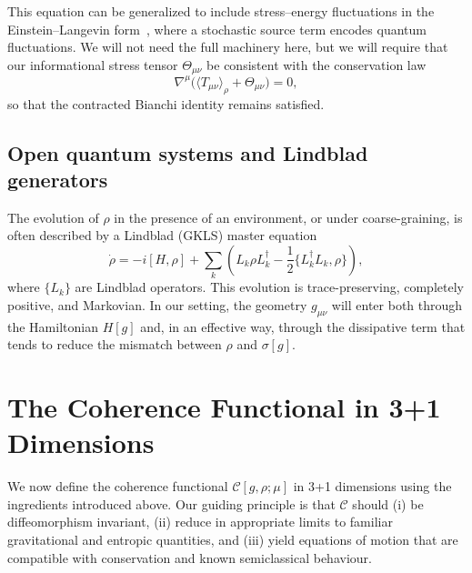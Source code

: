 \documentclass[aps,prd,twocolumn,superscriptaddress,nofootinbib,floatfix]{revtex4-2}
\newcommand{\Cfunc}{\mathcal{C}}
\newcommand{\Tmn}{\Theta_{\mu\nu}}
\begin{document}
This equation can be generalized to include stress--energy fluctuations in the Einstein--Langevin form~\cite{HuVerdaguer2008}, where a stochastic source term encodes quantum fluctuations.
We will not need the full machinery here, but we will require that our informational stress tensor $\Tmn$ be consistent with the conservation law
\begin{equation}
    \nabla^\mu\big(
        \langle T_{\mu\nu}\rangle_\rho + \Tmn
    \big) = 0,
    \label{eq:conservation}
\end{equation}
so that the contracted Bianchi identity remains satisfied.

\subsection{Open quantum systems and Lindblad generators}

The evolution of $\rho$ in the presence of an environment, or under coarse-graining, is often described by a Lindblad (GKLS) master equation~\cite{Lindblad1976}
\begin{equation}
    \dot{\rho}
    =
    -i[H,\rho]
    +
    \sum_k
    \left(
        L_k \rho L_k^\dagger
        - \frac{1}{2}\{L_k^\dagger L_k,\rho\}
    \right),
    \label{eq:lindblad}
\end{equation}
where $\{L_k\}$ are Lindblad operators.
This evolution is trace-preserving, completely positive, and Markovian.
In our setting, the geometry $g_{\mu\nu}$ will enter both through the Hamiltonian $H[g]$ and, in an effective way, through the dissipative term that tends to reduce the mismatch between $\rho$ and $\sigma[g]$.




\section{The Coherence Functional in 3+1 Dimensions}
\label{sec:coherence-functional}

We now define the coherence functional $\Cfunc[g,\rho;\mu]$ in 3+1 dimensions using the ingredients introduced above.
Our guiding principle is that $\Cfunc$ should (i) be diffeomorphism invariant, (ii) reduce in appropriate limits to familiar gravitational and entropic quantities, and (iii) yield equations of motion that are compatible with conservation and known semiclassical behaviour.
\end{document}
